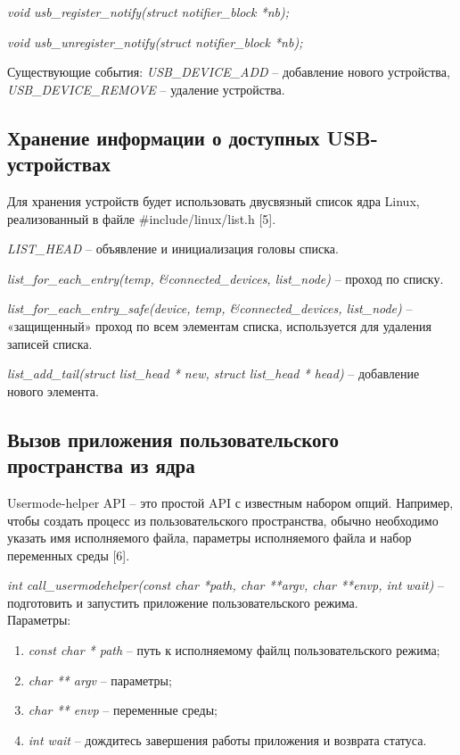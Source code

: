 \documentclass[a4paper, 10pt]{article}
\begin{document}
	\textit{void usb\_register\_notify(struct notifier\_block *nb);}
	
	\textit{void usb\_unregister\_notify(struct notifier\_block *nb);}
	
	\hspace*{-5mm}Существующие события: \textit{USB\_DEVICE\_ADD} -- добавление нового устройства, \textit{USB\_DEVICE\_REMOVE} -- удаление устройства.
	\subsection{Хранение информации о доступных USB-устройствах}
	Для хранения устройств будет использовать двусвязный список ядра Linux, реализованный в файле \#include/linux/list.h [5].
	
	\textit{LIST\_HEAD} -- объявление и инициализация головы списка.
	
	\textit{list\_for\_each\_entry(temp, \&connected\_devices, list\_node)} -- проход по списку.
	
	\textit{list\_for\_each\_entry\_safe(device, temp, \&connected\_devices, list\_node)} -- «защищенный» проход по всем элементам списка, используется для удаления записей списка.
	
	\textit{list\_add\_tail(struct list\_head * new, struct list\_head * head) }-- добавление нового элемента.
	\subsection{Вызов приложения пользовательского пространства из ядра}
	\hspace*{5mm}Usermode-helper API -- это простой API с известным набором опций. Например, чтобы создать процесс из пользовательского пространства, обычно необходимо указать имя исполняемого файла, параметры исполняемого файла и набор переменных среды [6].
	
	\textit{int call\_usermodehelper(const char *path, char **argv, char **envp, int wait)} -- подготовить и запустить приложение пользовательского режима.
	\\ Параметры:
	\begin{enumerate}
		\item \textit{const char * path} -- путь к исполняемому файлц пользовательского режима;
		\item \textit{char ** argv} -- параметры;
		\item \textit{char ** envp} --  переменные среды;
		\item \textit{int wait}  -- дождитесь завершения работы приложения и возврата статуса.
	\end{enumerate}
	
\end{document}
